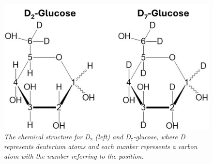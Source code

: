 \documentclass[class=article, crop=false]{standalone}
\begin{document}
\begin{figure}
    \centering
    \includegraphics[width = 1\textwidth]{Figures/Glucose/Glucose.png}
    \caption{\textit{The chemical structure for D$_2$ (left) and D$_7$-glucose, where D represents deuterium atoms and each number represents a carbon atom with the number referring to the position.}}
    \label{fig:Glu:Glucose}
\end{figure}
\end{document}
